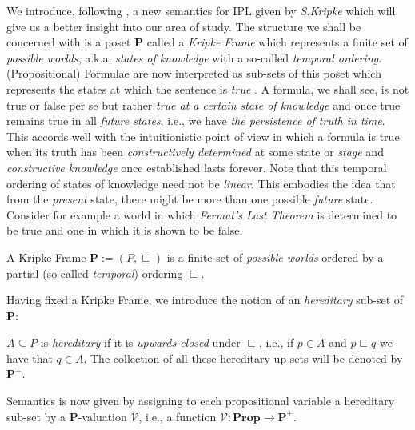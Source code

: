 	We introduce, following \cite{goldblatt}, a new semantics for IPL given by \emph{S.Kripke} which will give us a better insight into our area of study. \newline
	The structure we shall be concerned with is a poset \textbf{P} called a \emph{Kripke Frame}  which represents a finite set of \emph{possible worlds}, a.k.a. \emph{states of knowledge} with a so-called \emph{temporal ordering}.\newline
	(Propositional) Formulae are now interpreted as sub-sets of this poset which represents the states at which the sentence is \emph{true} . \newline
	A formula, we shall see, is not true or false per se but rather \emph{true at a certain state of knowledge} and once true remains true in all \emph{future states}, i.e., we have \emph{the persistence of truth in time}. \newline
	This accords well with the intuitionistic point of view in which a formula is true when its truth has been \emph{constructively determined} at some state or \emph{stage} and \emph{constructive knowledge} once established lasts forever. \newline
	Note that this temporal ordering of states of knowledge need not be \emph{linear}. This embodies the idea that from the \emph{present} state, there might be more than one possible \emph{future} state. Consider for example a world in which \emph{Fermat's Last Theorem} is determined to be true and one in which it is shown to be false. 
	
	\begin{definition}
	A Kripke Frame $\textbf{P} := (P, \sqsubseteq)$ is a finite set of \emph{possible worlds}
	ordered by a partial (so-called \emph{temporal}) ordering $\sqsubseteq$.
	\end{definition} 
	
	Having fixed a Kripke Frame,
	we introduce the notion of an \emph{hereditary} sub-set of \textbf{P}:
	
	\begin{definition}
		$A \subseteq P$ is \emph{hereditary} if it is \emph{upwards-closed} under $\sqsubseteq$, i.e., if $p \in A$ and $p \sqsubseteq q$ we have that $q \in A$. \newline
		The collection of all these hereditary up-sets will be denoted by $\textbf{P}^+$.
	\end{definition}  
	
	Semantics is now given by assigning to each propositional variable a hereditary sub-set by a \textbf{P}-valuation $\mathcal{V}$, i.e., a function $\mathcal{V} : \textbf{Prop} \rightarrow \textbf{P}^+$. 
	
